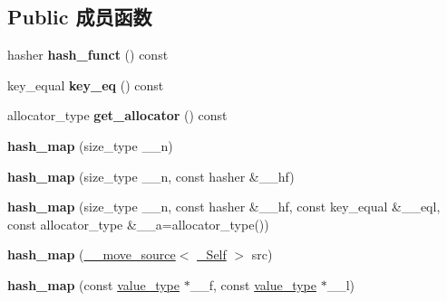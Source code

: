 \subsection*{Public 成员函数}
\begin{DoxyCompactItemize}
\item 
\mbox{\label{classhash__map_a582f5b0b20a50ef4d68a49a3db844667}} 
hasher {\bfseries hash\+\_\+funct} () const
\item 
\mbox{\label{classhash__map_a3e67eb31576ef9786ebc9fa33f2e02af}} 
key\+\_\+equal {\bfseries key\+\_\+eq} () const
\item 
\mbox{\label{classhash__map_a8b9ef743669826aea896e695678ab9bb}} 
allocator\+\_\+type {\bfseries get\+\_\+allocator} () const
\item 
\mbox{\label{classhash__map_aea50951a9f5da2c859c33d1f5d346064}} 
{\bfseries hash\+\_\+map} (size\+\_\+type \+\_\+\+\_\+n)
\item 
\mbox{\label{classhash__map_a27593a7c321d5078e0f4d11a57785448}} 
{\bfseries hash\+\_\+map} (size\+\_\+type \+\_\+\+\_\+n, const hasher \&\+\_\+\+\_\+hf)
\item 
\mbox{\label{classhash__map_a043a3008849e7c91ff5249980db32433}} 
{\bfseries hash\+\_\+map} (size\+\_\+type \+\_\+\+\_\+n, const hasher \&\+\_\+\+\_\+hf, const key\+\_\+equal \&\+\_\+\+\_\+eql, const allocator\+\_\+type \&\+\_\+\+\_\+a=allocator\+\_\+type())
\item 
\mbox{\label{classhash__map_aca2065e9599b8744c856afca35976fe5}} 
{\bfseries hash\+\_\+map} (\hyperlink{class____move__source}{\+\_\+\+\_\+move\+\_\+source}$<$ \hyperlink{classhash__map}{\+\_\+\+Self} $>$ src)
\item 
\mbox{\label{classhash__map_aaff81e8cc4573a53de52c05110233dcb}} 
{\bfseries hash\+\_\+map} (const \hyperlink{structpair}{value\+\_\+type} $\ast$\+\_\+\+\_\+f, const \hyperlink{structpair}{value\+\_\+type} $\ast$\+\_\+\+\_\+l)
\item 
\mbox{\label{classhash__map_aa244df8910638c90dd48f664c4c2040a}} 

\end{DoxyCompactItemize}

